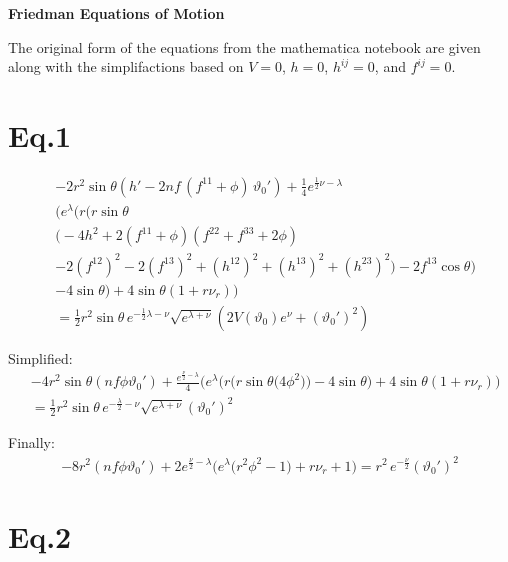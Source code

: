 \documentclass[12pt]{article}
\begin{document}
\begin{center}
  \Large\textbf{Friedman Equations of Motion} \\
  \large{}
\end{center}

The original form of the equations from the mathematica notebook are given along with the simplifactions based on $V=0$, $h=0$, $h^{ij}=0$, and $f^{ij}=0$.

\section*{Eq.1}

\begin{align*}
& -2r^2 \sin\theta \left( h' - 2nf \,(f^{11} + \phi)\, \vartheta_0' \right)
+\tfrac{1}{4} e^{\frac{1}{2}\nu - \lambda}
\\ &\Big(
 e^{\lambda} \big(
   r \big(
     r \sin\theta \\ &\big(
       -4h^2 
       + 2(f^{11} + \phi)(f^{22} + f^{33} + 2\phi) \\
       &- 2(f^{12})^2 - 2(f^{13})^2 
       + (h^{12})^2 + (h^{13})^2 + (h^{23})^2
     \big)
     - 2 f^{13} \cos\theta
   \big) \\
   &- 4\sin\theta
 \big)
 + 4\sin\theta \left(1 + r \nu_{r}\right)
\Big) \nonumber \\
&= \tfrac{1}{2} r^2 \sin\theta\, e^{-\frac{1}{2}\lambda - \nu}
  \sqrt{e^{\lambda + \nu}}
  \left( 2V(\vartheta_0)e^{\nu} + (\vartheta_0')^2 \right)
\end{align*}

Simplified:
\begin{align*}
& -4r^2 \sin\theta \left(nf\phi\vartheta_0' \right)
+\tfrac{e^{\frac{\nu}{2} - \lambda}}{4}
\Big(
 e^{\lambda} \big(
   r \big(
     r \sin\theta \big(
       4\phi^2\big)
   \big)
   - 4\sin\theta
 \big)
 + 4\sin\theta \left(1 + r \nu_{r}\right)
\Big) \\
&= \tfrac{1}{2} r^2 \sin\theta\, e^{-\frac{\lambda}{2} - \nu}
  \sqrt{e^{\lambda + \nu}} (\vartheta_0')^2
\end{align*}

Finally:
\begin{align*}
-8r^2 \left(nf\phi\vartheta_0' \right)
+2e^{\frac{\nu}{2} - \lambda}
\Big( e^{\lambda} \big(r^2\phi^2 - 1 \big) + r\nu_{r} + 1\Big)
= r^2 \, e^{-\frac{\nu}{2}}(\vartheta_0')^2
\end{align*}

\section*{Eq.2}
\end{document}
